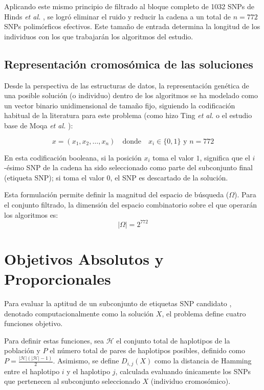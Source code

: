 Aplicando este mismo principio de filtrado al bloque completo de 1032 SNPs de Hinds \textit{et al.} \cite{hinds2005whole}, se logró eliminar el ruido y reducir la cadena a un total de $n = 772$ SNPs polimórficos efectivos. Este tamaño de entrada determina la longitud de los individuos con los que trabajarán los algoritmos del estudio.

\subsection{Representación cromosómica de las soluciones}
Desde la perspectiva de las estructuras de datos, la representación genética de una posible solución (o individuo) dentro de los algoritmos se ha modelado como un vector binario unidimensional de tamaño fijo, siguiendo la codificación habitual de la literatura para este problema (como hizo Ting \textit{et al.} \cite{ting2010multi} o el estudio base de Moqa \textit{et al.} \cite{moqa2022assessing}):

\[ 
x = (x_1, x_2, \dots, x_n) \quad \text{donde} \quad x_i \in \{0, 1\} \text{ y } n = 772 
\]

En esta codificación booleana, si la posición $x_i$ toma el valor $1$, significa que el $i$-ésimo SNP de la cadena ha sido seleccionado como parte del subconjunto final (etiqueta SNP); si toma el valor $0$, el SNP es descartado de la solución.

Esta formulación permite definir la magnitud del espacio de búsqueda ($\Omega$). Para el conjunto filtrado, la dimensión del espacio combinatorio sobre el que operarán los algoritmos es:
\[ 
|\Omega| = 2^{772} 
\]

\section{Objetivos Absolutos y Proporcionales}

Para evaluar la aptitud de un subconjunto de etiquetas SNP candidato \cite{ting2010multi}, denotado computacionalmente como la solución $X$, el problema define cuatro funciones objetivo.

Para definir estas funciones, sea $\mathcal{H}$ el conjunto total de haplotipos de la población y $P$ el número total de pares de haplotipos posibles, definido como $P = \frac{|\mathcal{H}|(|\mathcal{H}|-1)}{2}$. Asimismo, se define $D_{i,j}(X)$ como la distancia de Hamming entre el haplotipo $i$ y el haplotipo $j$, calculada evaluando únicamente los SNPs que pertenecen al subconjunto seleccionado $X$ (individuo cromosómico).

